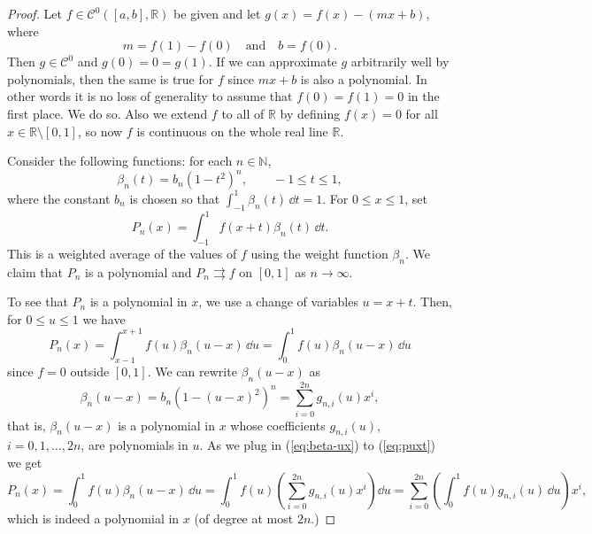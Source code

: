 \documentclass[11pt]{article}
\begin{document}
\begin{proof}
  Let $f \in \mathcal{C}^0([a,b], \mathbb{R})$ be given and let $g(x) = f(x) - (mx+b)$, where
  \[
    m = f(1) - f(0) \quad \text{and} \quad b = f(0).
  \]
  Then $g \in \mathcal{C}^0$ and $g(0) = 0 = g(1)$.
  If we can approximate $g$ arbitrarily well by polynomials, then the same is true for $f$ since $mx + b$ is also a polynomial.
  In other words it is no loss of generality to assume that $f(0) = f(1) = 0$ in the first place.  We do so.
  Also we extend $f$ to all of $\mathbb{R}$ by defining $f(x) = 0$ for all $x \in \mathbb{R} \setminus [0,1]$, so now $f$ is continuous on the whole real line $\mathbb{R}$.

  Consider the following functions: for each $n \in \mathbb{N}$,
  \[
    \beta_n(t) = b_n (1-t^2)^n, \qquad -1 \leqslant t \leqslant 1,
  \]
  where the constant $b_n$ is chosen so that $\int_{-1}^1 \beta_n(t) \, \dd t = 1$.
  For $0 \leqslant x \leqslant 1$, set
  \[
    P_n(x) = \int_{-1}^1 f(x+t) \beta_n(t) \, \dd t.
  \]
  This is a weighted average of the values of $f$ using the weight function $\beta_n$.
  We claim that $P_n$ is a polynomial and $P_n \rightrightarrows f$ on $[0,1]$ as $n \to \infty$.

  To see that $P_n$ is a polynomial in $x$, we use a change of variables $u = x+t$.
  Then, for $0 \leqslant u \leqslant 1$ we have
  \begin{equation}
    \label{eq:puxt}
    P_n(x) = \int_{x-1}^{x+1} f(u) \beta_n(u-x) \, \dd u = \int_0^1 f(u) \beta_n(u-x) \, \dd u
  \end{equation}
  since $f = 0$ outside $[0,1]$.
  We can rewrite $\beta_n(u-x)$ as
  \begin{equation}
    \label{eq:beta-ux}
    \beta_n(u-x) = b_n ( 1 - (u-x)^2 )^n = \sum_{i=0}^{2n} g_{n,i}(u) x^i,
  \end{equation}
  that is, $\beta_n(u-x)$ is a polynomial in $x$ whose coefficients $g_{n,i}(u)$, $i=0, 1, \dots, 2n$, are polynomials in $u$.
  As we plug in (\ref{eq:beta-ux}) to (\ref{eq:puxt}) we get
  \[
    P_n(x) = \int_0^1 f(u) \beta_n(u-x) \, \dd u
    = \int_0^1 f(u) \left( \sum_{i=0}^{2n} g_{n,i}(u) x^i \right) \dd u 
    = \sum_{i=0}^{2n} \left( \int_0^1 f(u) g_{n,i}(u) \, \dd u \right) x^i,
  \]
  which is indeed a polynomial in $x$ (of degree at most $2n$.)


\end{proof}
\end{document}
